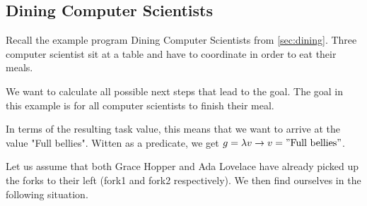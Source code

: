 \subsection{Dining Computer Scientists}
\label{sec:assistivedining}

Recall the example program Dining Computer Scientists from \cref{sec:dining}.
Three computer scientist sit at a table and have to coordinate in order to eat their meals.

We want to calculate all possible next steps that lead to the goal.
The goal in this example is for all computer scientists to finish their meal.

In terms of the resulting task value, this means that we want to arrive at the value "Full bellies".
Witten as a predicate, we get $g=\lambda v\rightarrow v = "\text{Full bellies}"$.

Let us assume that both Grace Hopper and Ada Lovelace have already picked up the forks to their left (fork1 and fork2 respectively).
We then find ourselves in the following situation.

